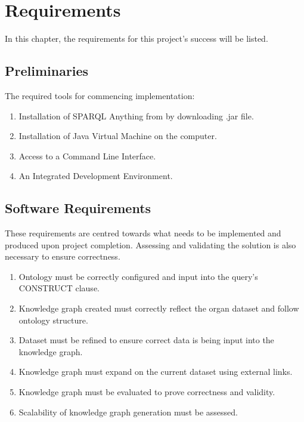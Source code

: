 \chapter{Requirements}
In this chapter, the requirements for this project's success will be listed.

\section{Preliminaries}
\hspace{0.5cm} The required tools for commencing implementation:
\begin{enumerate}
    \itemsep0em 
\item Installation of SPARQL Anything from \cite{sparqlanythinggithub} by downloading .jar file.
\item Installation of Java Virtual Machine on the computer. 
\item Access to a Command Line Interface.
\item An Integrated Development Environment.
\end{enumerate}

\section{Software Requirements}
\hspace{0.5cm} These requirements are centred towards what needs to be implemented and produced upon project completion. Assessing and validating the solution is also necessary to ensure correctness.
\begin{enumerate}
    \itemsep0em 
\item Ontology must be correctly configured and input into the query's CONSTRUCT clause.
\item Knowledge graph created must correctly reflect the organ dataset and follow ontology structure.
\item Dataset must be refined to ensure correct data is being input into the knowledge graph.
\item Knowledge graph must expand on the current dataset using external links.
\item Knowledge graph must be evaluated to prove correctness and validity.
\item Scalability of knowledge graph generation must be assessed.
\end{enumerate}

